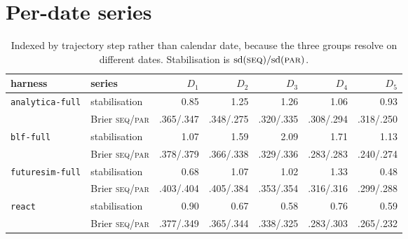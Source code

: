 \documentclass[10pt]{article}
\newcommand{\seq}{\textsc{seq}}
\newcommand{\pl}{\textsc{par}}
\newcommand{\hr}[1]{\texttt{#1}}
\begin{document}
\FloatBarrier
\section{Per-date series}\label{app:series}
\begin{table}[htbp]\centering\small
\begin{tabular}{@{}llrrrrr@{}}
\toprule
harness & series & $D_1$ & $D_2$ & $D_3$ & $D_4$ & $D_5$ \\
\midrule
\multirow{2}{*}{\hr{analytica-full}} & stabilisation & 0.85 & 1.25 & 1.26 & 1.06 & 0.93 \\
 & Brier \seq/\pl & .365/.347 & .348/.275 & .320/.335 & .308/.294 & .318/.250 \\
\midrule
\multirow{2}{*}{\hr{blf-full}} & stabilisation & 1.07 & 1.59 & 2.09 & 1.71 & 1.13 \\
 & Brier \seq/\pl & .378/.379 & .366/.338 & .329/.336 & .283/.283 & .240/.274 \\
\midrule
\multirow{2}{*}{\hr{futuresim-full}} & stabilisation & 0.68 & 1.07 & 1.02 & 1.33 & 0.48 \\
 & Brier \seq/\pl & .403/.404 & .405/.384 & .353/.354 & .316/.316 & .299/.288 \\
\midrule
\multirow{2}{*}{\hr{react}} & stabilisation & 0.90 & 0.67 & 0.58 & 0.76 & 0.59 \\
 & Brier \seq/\pl & .377/.349 & .365/.344 & .338/.325 & .283/.303 & .265/.232 \\
\bottomrule
\end{tabular}
\caption{Indexed by trajectory step rather than calendar date, because the three groups resolve on
different dates. Stabilisation is $\mathrm{sd}(\seq)/\mathrm{sd}(\pl)$.}
\label{tab:series}
\end{table}
\end{document}
